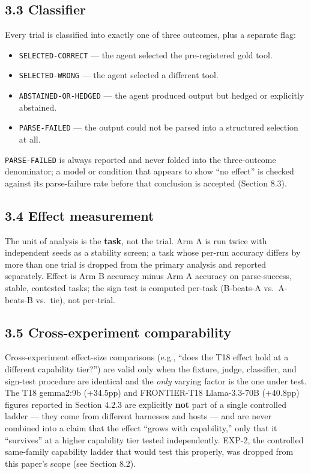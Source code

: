 \hypertarget{classifier}{%
\subsection{3.3 Classifier}\label{classifier}}

Every trial is classified into exactly one of three outcomes, plus a
separate flag:

\begin{itemize}
\tightlist
\item
  \texttt{SELECTED-CORRECT} --- the agent selected the pre-registered
  gold tool.
\item
  \texttt{SELECTED-WRONG} --- the agent selected a different tool.
\item
  \texttt{ABSTAINED-OR-HEDGED} --- the agent produced output but hedged
  or explicitly abstained.
\item
  \texttt{PARSE-FAILED} --- the output could not be parsed into a
  structured selection at all.
\end{itemize}

\texttt{PARSE-FAILED} is always reported and never folded into the
three-outcome denominator; a model or condition that appears to show
``no effect'' is checked against its parse-failure rate before that
conclusion is accepted (Section 8.3).

\hypertarget{effect-measurement}{%
\subsection{3.4 Effect measurement}\label{effect-measurement}}

The unit of analysis is the \textbf{task}, not the trial. Arm A is run
twice with independent seeds as a stability screen; a task whose per-run
accuracy differs by more than one trial is dropped from the primary
analysis and reported separately. Effect is Arm B accuracy minus Arm A
accuracy on parse-success, stable, contested tasks; the sign test is
computed per-task (B-beats-A vs.~A-beats-B vs.~tie), not per-trial.

\hypertarget{cross-experiment-comparability}{%
\subsection{3.5 Cross-experiment
comparability}\label{cross-experiment-comparability}}

Cross-experiment effect-size comparisons (e.g., ``does the T18 effect
hold at a different capability tier?'') are valid only when the fixture,
judge, classifier, and sign-test procedure are identical and the
\emph{only} varying factor is the one under test. The T18 gemma2:9b
(+34.5pp) and FRONTIER-T18 Llama-3.3-70B (+40.8pp) figures reported in
Section 4.2.3 are explicitly \textbf{not} part of a single controlled
ladder --- they come from different harnesses and hosts --- and are
never combined into a claim that the effect ``grows with capability,''
only that it ``survives'' at a higher capability tier tested
independently. EXP-2, the controlled same-family capability ladder that
would test this properly, was dropped from this paper's scope (see
Section 8.2).

